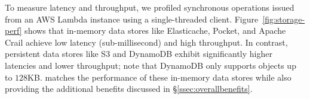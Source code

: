 To measure latency and throughput, we profiled synchronous operations issued from an AWS Lambda instance using a single-threaded client. Figure~\ref{fig:storage-perf} shows that in-memory data stores like Elasticache, Pocket, and Apache Crail achieve low latency (sub-millisecond) and high throughput. In contrast, persistent data stores like S3 and DynamoDB exhibit significantly higher latencies and lower throughput; note that DynamoDB only supports objects up to $128$KB. \jiffy matches the performance of these in-memory data stores while also providing the additional benefits discussed in \S\ref{ssec:overallbenefits}.


\begin{figure}[t]
  \centering
  \\
\end{figure}
